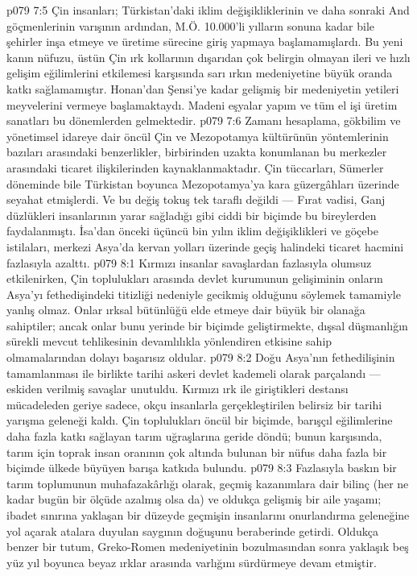 \vs p079 7:5 Çin insanları; Türkistan’daki iklim değişikliklerinin ve daha sonraki And göçmenlerinin varışının ardından, M.Ö. 10.000’li yılların sonuna kadar bile şehirler inşa etmeye ve üretime sürecine giriş yapmaya başlamamışlardı. Bu yeni kanın nüfuzu, üstün Çin ırk kollarının dışarıdan çok belirgin olmayan ileri ve hızlı gelişim eğilimlerini etkilemesi karşısında sarı ırkın medeniyetine büyük oranda katkı sağlamamıştır. Honan’dan Şensi’ye kadar gelişmiş bir medeniyetin yetileri meyvelerini vermeye başlamaktaydı. Madeni eşyalar yapım ve tüm el işi üretim sanatları bu dönemlerden gelmektedir.
\vs p079 7:6 Zamanı hesaplama, gökbilim ve yönetimsel idareye dair öncül Çin ve Mezopotamya kültürünün yöntemlerinin bazıları arasındaki benzerlikler, birbirinden uzakta konumlanan bu merkezler arasındaki ticaret ilişkilerinden kaynaklanmaktadır. Çin tüccarları, Sümerler döneminde bile Türkistan boyunca Mezopotamya’ya kara güzergâhları üzerinde seyahat etmişlerdi. Ve bu değiş tokuş tek taraflı değildi --- Fırat vadisi, Ganj düzlükleri insanlarının yarar sağladığı gibi ciddi bir biçimde bu bireylerden faydalanmıştı. İsa’dan önceki üçüncü bin yılın iklim değişiklikleri ve göçebe istilaları, merkezi Asya’da kervan yolları üzerinde geçiş halindeki ticaret hacmini fazlasıyla azalttı.
\vs p079 8:1 Kırmızı insanlar savaşlardan fazlasıyla olumsuz etkilenirken, Çin toplulukları arasında devlet kurumunun gelişiminin onların Asya’yı fethedişindeki titizliği nedeniyle gecikmiş olduğunu söylemek tamamiyle yanlış olmaz. Onlar ırksal bütünlüğü elde etmeye dair büyük bir olanağa sahiptiler; ancak onlar bunu yerinde bir biçimde geliştirmekte, dışsal düşmanlığın sürekli mevcut tehlikesinin devamlılıkla yönlendiren etkisine sahip olmamalarından dolayı başarısız oldular.
\vs p079 8:2 Doğu Asya’nın fethedilişinin tamamlanması ile birlikte tarihi askeri devlet kademeli olarak parçalandı --- eskiden verilmiş savaşlar unutuldu. Kırmızı ırk ile giriştikleri destansı mücadeleden geriye sadece, okçu insanlarla gerçekleştirilen belirsiz bir tarihi yarışma geleneği kaldı. Çin toplulukları öncül bir biçimde, barışçıl eğilimlerine daha fazla katkı sağlayan tarım uğraşlarına geride döndü; bunun karşısında, tarım için toprak insan oranının çok altında bulunan bir nüfus daha fazla bir biçimde ülkede büyüyen barışa katkıda bulundu.
\vs p079 8:3 Fazlasıyla baskın bir tarım toplumunun muhafazakârlığı olarak, geçmiş kazanımlara dair bilinç (her ne kadar bugün bir ölçüde azalmış olsa da) ve oldukça gelişmiş bir aile yaşamı; ibadet sınırına yaklaşan bir düzeyde geçmişin insanlarını onurlandırma geleneğine yol açarak atalara duyulan saygının doğuşunu beraberinde getirdi. Oldukça benzer bir tutum, Greko\hyp{}Romen medeniyetinin bozulmasından sonra yaklaşık beş yüz yıl boyunca beyaz ırklar arasında varlığını sürdürmeye devam etmiştir.
